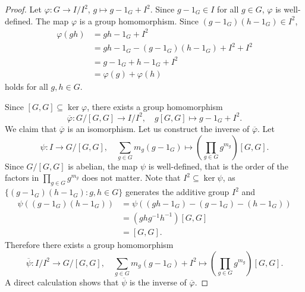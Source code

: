 \begin{proof}
    Let $\varphi\colon G\to I/I^2$, $g\mapsto g-1_G+I^2$. Since $g-1_G\in I$ for all $g\in G$, $\varphi$ is well-defined. The map $\varphi$ is a group homomorphism. Since 
    $(g-1_G)(h-1_G)\in I^2$, 
    \begin{align*}
    \varphi(gh) &= gh-1_G+I^2\\
    &=gh-1_G-(g-1_G)(h-1_G)+I^2+I^2\\
    &=g-1_G+h-1_G+I^2\\
    &=\varphi(g)+\varphi(h)
    \end{align*}
    holds for all $g,h\in G$. 

    Since $[G,G]\subseteq\ker\varphi$, there exists a group homomorphism
    \[
    \overline{\varphi}\colon G/[G,G]\to I/I^2,\quad 
    g[G,G]\mapsto g-1_G+I^2.
    \]
    We claim that $\overline{\varphi}$ is an isomorphism. 
    Let us construct the inverse of $\overline{\varphi}$. Let 
    \[
    \psi\colon I\to G/[G,G],\quad 
    \sum_{g\in G}m_g(g-1_G)\mapsto \left(\prod_{g\in G}g^{m_g}\right)[G,G].
    \]
    Since $G/[G,G]$ is abelian, the map $\psi$ is well-defined, that is
    the order of the factors in $\prod_{g\in G}g^{m_g}$ does not matter. Note that 
    $I^2\subseteq\ker\psi$, as 
    $\{(g-1_G)(h-1_G):g,h\in G\}$ generates the additive group $I^2$ 
    and 
    \begin{align*}
        \psi((g-1_G)(h-1_G))&=\psi( (gh-1_G)-(g-1_G)-(h-1_G))\\
        &=(ghg^{-1}h^{-1})[G,G]\\
        &=[G,G].
    \end{align*}
    Therefore there exists a group homomorphism
    \[
    \overline{\psi}\colon I/I^2\to G/[G,G],\quad 
    \sum_{g\in G}m_g(g-1_G)+I^2\mapsto \left(\prod_{g\in G}g^{m_g}\right)[G,G].
    \]
    A direct calculation shows that $\overline{\psi}$ is the inverse 
    of $\overline{\varphi}$. 
\end{proof}



